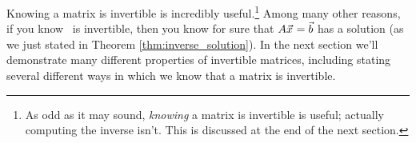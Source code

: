 Knowing a matrix is invertible is incredibly useful.\footnote{As odd as it may sound, \textit{knowing} a matrix is invertible is useful; actually computing the inverse isn't. This is discussed at the end of the next section.} Among many other reasons, if you know \tta\ is invertible, then you know for sure that $A\vec{x_{}}=\vec{b}$ has a solution (as we just stated in Theorem \ref{thm:inverse_solution}). In the next section we'll demonstrate many different properties of invertible matrices, including stating several different ways in which we know that a matrix is invertible.\\




